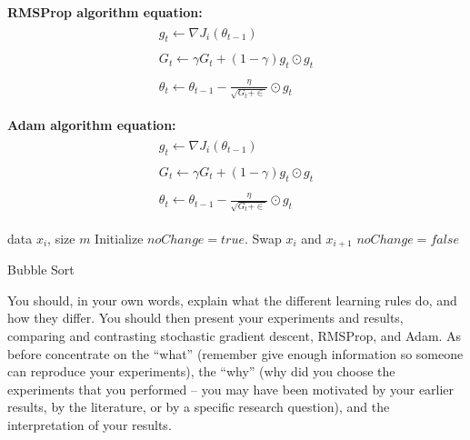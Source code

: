 \documentclass{article}
\begin{document}
\textbf{RMSProp algorithm equation:}
\begin{equation}
\begin{aligned}
\begin{array}{l}g_t\leftarrow\nabla J_i\left(\theta_{t-1}\right)\end{array}\\
\begin{array}{l}G_t\leftarrow\gamma G_t+\left(1-\gamma\right)g_t\odot g_t\end{array}\\
\begin{array}{l}\theta_t\leftarrow\theta_{t-1}-\frac\eta{\sqrt{G_t+\in}}\odot g_t\end{array}
\end{aligned}
\end{equation}

\textbf{Adam algorithm equation:}
\begin{equation}
\begin{aligned}
\begin{array}{l}g_t\leftarrow\nabla J_i\left(\theta_{t-1}\right)\end{array}\\
\begin{array}{l}G_t\leftarrow\gamma G_t+\left(1-\gamma\right)g_t\odot g_t\end{array}\\
\begin{array}{l}\theta_t\leftarrow\theta_{t-1}-\frac\eta{\sqrt{G_t+\in}}\odot g_t\end{array}
\end{aligned}
\end{equation}


\begin{algorithm}[ht]
\begin{algorithmic}
    data $x_i$, size $m$
   \REPEAT
   \STATE Initialize $noChange = true$.
   \STATE Swap $x_i$ and $x_{i+1}$
   \STATE $noChange = false$
   \ENDIF
   \ENDFOR
\end{algorithmic}
  \caption{Bubble Sort}
  \label{alg:example}
\end{algorithm}





You should, in your own words, explain what the different learning rules do, and how they differ.  You should then present your experiments and results, comparing and contrasting stochastic gradient descent, RMSProp, and Adam.  As before concentrate on the ``what'' (remember give enough information so someone can reproduce your experiments), the ``why'' (why did you choose the experiments that you performed -- you may have been motivated by your earlier results, by the literature, or by a specific research question), and the interpretation of your results.
\end{document}
